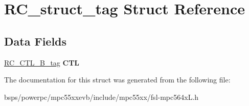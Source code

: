 \hypertarget{structRC__struct__tag}{}\section{R\+C\+\_\+struct\+\_\+tag Struct Reference}
\label{structRC__struct__tag}
\subsection*{Data Fields}
\begin{DoxyCompactItemize}
\item 
\mbox{\label{structRC__struct__tag_aea83d827c54035af84866955c767ba0f}} 
\mbox{\hyperlink{unionRC__CTL__32B__tag}{R\+C\+\_\+\+C\+T\+L\+\_\+B\+\_\+tag}} {\bfseries C\+TL}
\end{DoxyCompactItemize}


The documentation for this struct was generated from the following file\+:\begin{DoxyCompactItemize}
\item 
bsps/powerpc/mpc55xxevb/include/mpc55xx/fsl-\/mpc564x\+L.\+h\end{DoxyCompactItemize}
